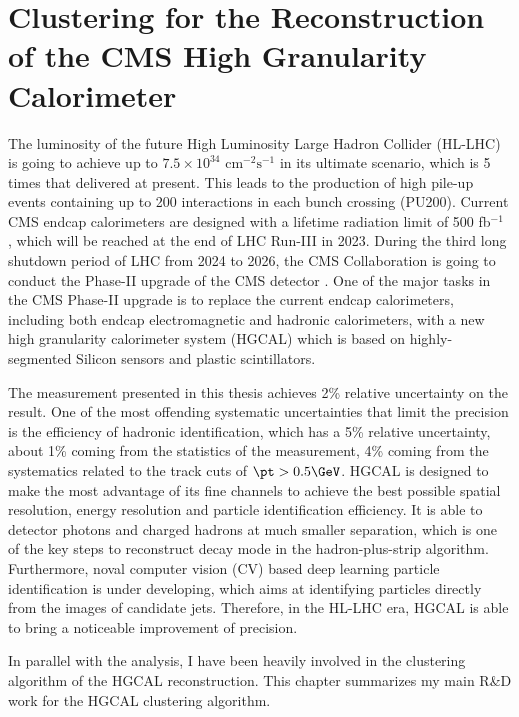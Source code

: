 \chapter{Clustering for the Reconstruction of the CMS High Granularity Calorimeter}
\label{sec:hgcal}


The luminosity of the future High Luminosity Large Hadron Collider (HL-LHC) is going to achieve up to $7.5\times 10^{34}$ $\text{cm}^{-2}\text{s}^{-1}$ \cite{hllhcweb} in its ultimate scenario, which is 5 times that delivered at present. This leads to the production of high pile-up events containing up to 200 interactions in each bunch crossing (PU200). Current CMS endcap calorimeters \cite{Chatrchyan:2008aa} are designed with a lifetime radiation limit of 500 fb$^{-1}$ \cite{CMSCollaboration:2015zni}, which will be reached at the end of LHC Run-III in 2023. During the third long shutdown period of LHC from 2024 to 2026, the CMS Collaboration is going to conduct the Phase-II upgrade of the CMS detector \cite{CMSCollaboration:2015zni}. One of the major tasks in the CMS Phase-II upgrade is to replace the current endcap calorimeters, including both endcap electromagnetic and hadronic calorimeters, with a new high granularity calorimeter system (HGCAL) which is based on highly-segmented Silicon sensors and plastic scintillators.


The \BWl measurement presented in this thesis achieves 2\% relative uncertainty on the \BWt result. One of the most offending systematic uncertainties that limit the precision is the efficiency of hadronic identification, which has a 5\% relative uncertainty, about 1\% coming from the statistics of the measurement, 4\% coming from the systematics related to the track cuts of $\pt>0.5\GeV$. HGCAL is designed to make the most advantage of its fine channels to achieve the best possible spatial resolution, energy resolution and particle identification efficiency. It is able to detector photons and charged hadrons at much smaller separation, which is one of the key steps to reconstruct \PGth decay mode in the hadron-plus-strip algorithm. Furthermore, noval computer vision (CV) based deep learning particle identification is under developing, which aims at identifying particles directly from the images of candidate jets. Therefore, in the HL-LHC era, HGCAL is able to bring a noticeable improvement of \BWl precision.

In parallel with the \BWl analysis, I have been heavily involved in the clustering algorithm of the HGCAL reconstruction. This chapter summarizes my main R\&D work for the HGCAL clustering algorithm.










% 



